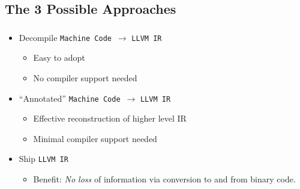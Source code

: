 \documentclass[mathserif,10pt]{beamer}
\newcommand{\cmt}[1]{}
\newcommand{\LIR}{{\tt LLVM IR}}
\newcommand{\MC}{{\tt Machine Code}}
\begin{document}
  \subsection{The 3 Possible Approaches} %
  \frame
  {
    \frametitle{\subsecname}
    \begin{itemize}
      \item Decompile \MC \ $\rightarrow$ \LIR
        \begin{itemize}
          \item Easy to adopt
          \item No compiler support needed
        \end{itemize}
      \item ``Annotated'' \MC \ $\rightarrow$ \LIR
        \begin{itemize}
          \item Effective reconstruction of higher level IR
          \item Minimal compiler support needed
        \end{itemize}
      \item Ship \LIR
        \begin{itemize}
          \item Benefit:  \emph{No loss} of information via conversion to and from binary code.
        \end{itemize}
    \end{itemize}


    \cmt{
There are 3 possible approaches to achive the goal;
to <read> .. his is easy to adopt adn mos of the programstoday are shipped as native binaries
  also no extra compiler support is needed

  Seconf is to generate the binaru woth some annotations on it, which help help in
  recpnsruct the hogh kevel ir
  This requires compiler support but the goal here to to genetate minimal annotions
  which is sufficient to generate an high leve ir

  Thrisd is to ship ir directly; Obviously there will be no info loss

  As u can see all of them are having atradeoff between odoption and quality of llvm ir

    }

  }
\end{document}
